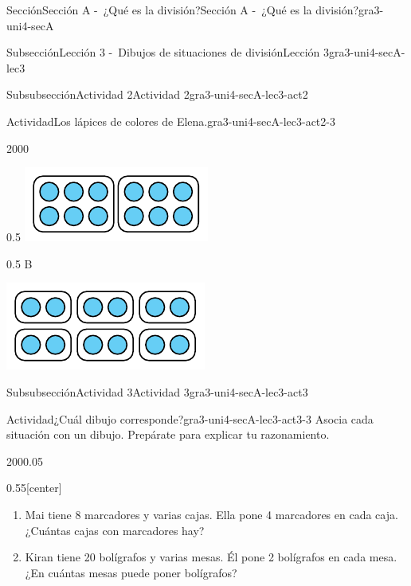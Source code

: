\documentclass[twoside,10pt,]{article}
\begin{document}
\begin{sectionptx}{Sección}{Sección A -~¿Qué es la división?}{}{Sección A -~¿Qué es la división?}{}{}{gra3-uni4-secA}
\begin{subsectionptx}{Subsección}{Lección 3 -~Dibujos de situaciones de división}{}{Lección 3}{}{}{gra3-uni4-secA-lec3}
\begin{subsubsectionptx}{Subsubsección}{Actividad 2}{}{Actividad 2}{}{}{gra3-uni4-secA-lec3-act2}
\begin{activity}{Actividad}{Los lápices de colores de Elena.}{gra3-uni4-secA-lec3-act2-3}
\begin{sidebyside}{2}{0}{0}{0}
\begin{sbspanel}{0.5}
\includegraphics[width=\linewidth]{external/tikz-source/tikz-file-149310.pdf}
\end{sbspanel}%
\begin{sbspanel}{0.5}%
B%
\par
\includegraphics[width=\linewidth]{external/tikz-source/tikz-file-149311.pdf}
\end{sbspanel}%
\end{sidebyside}%
\end{activity}%
\end{subsubsectionptx}
%
%
\typeout{************************************************}
\typeout{************************************************}
%
\begin{subsubsectionptx}{Subsubsección}{Actividad 3}{}{Actividad 3}{}{}{gra3-uni4-secA-lec3-act3}
\begin{activity}{Actividad}{¿Cuál dibujo corresponde?}{gra3-uni4-secA-lec3-act3-3}%
Asocia cada situación con un dibujo. Prepárate para explicar tu razonamiento.%
\begin{sidebyside}{2}{0}{0}{0.05}%
\begin{sbspanel}{0.55}[center]%
%
\begin{enumerate}
\item{}Mai tiene 8 marcadores y varias cajas. Ella pone 4 marcadores en cada caja. ¿Cuántas cajas con marcadores hay?%
\item{}Kiran tiene 20 bolígrafos y varias mesas. Él pone 2 bolígrafos en cada mesa. ¿En cuántas mesas puede poner bolígrafos?%

\end{enumerate}
\end{sbspanel}
\end{sidebyside}
\end{activity}
\end{subsubsectionptx}
\end{subsectionptx}
\end{sectionptx}
\end{document}
